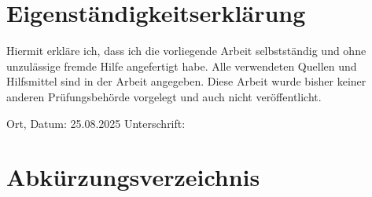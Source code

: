 \documentclass[a4paper,12pt]{article}
\begin{document}
	\newpage
	\section*{Eigenständigkeitserklärung}
	Hiermit erkläre ich, dass ich die vorliegende Arbeit selbstständig und ohne unzulässige fremde Hilfe angefertigt habe.  
	Alle verwendeten Quellen und Hilfsmittel sind in der Arbeit angegeben.  
	Diese Arbeit wurde bisher keiner anderen Prüfungsbehörde vorgelegt und auch nicht veröffentlicht.
	
		
	\vspace{2cm}
\noindent
Ort, Datum: 25.08.2025 \hspace{3cm}
Unterschrift: \hspace{1cm}


	\newpage
	\tableofcontents
	\newpage
	\listoffigures
	\newpage
	\listoftables
	\newpage
	
	\section*{Abkürzungsverzeichnis}
	
\end{document}
